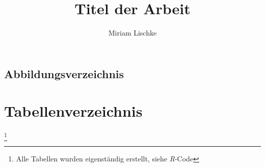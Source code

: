 \documentclass[12pt, a4paper, oneside]{article}
\title{\textbf{Titel der Arbeit}}
\author{Miriam Lischke}
\begin{document}


\begin{spacing}{1}
\setcounter{page}{2}
\tableofcontents
\end{spacing}
\newpage
\begin{spacing}{1}
\section*{Abbildungsverzeichnis} 
\renewcommand{\listfigurename}{}
\listoffigures
\end{spacing}
\newpage
\section*{Tabellenverzeichnis} 
\renewcommand{\listtablename}{}
\listoftables %
\footnote{Alle Tabellen wurden eigenständig erstellt, siehe \emph{R}-Code} 
\end{document}
